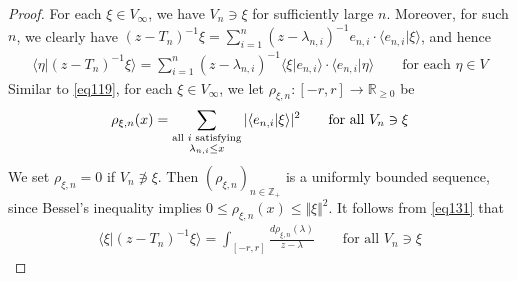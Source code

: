 \documentclass[12pt,b5paper,notitlepage]{article}
\theoremstyle{definition}
\theoremstyle{plain}
\newcommand{\bk}[1]{\langle {#1}\rangle}
\newcommand{\Zbb}{\mathbb Z}
\newcommand{\Rbb}{\mathbb R}
\numberwithin{equation}{section}
\begin{document}
\begin{proof}
For each $\xi\in V_\infty$, we have $V_n\ni\xi$ for sufficiently large $n$. Moreover, for such $n$, we clearly have $(z-T_n)^{-1}\xi=\sum_{i=1}^n(z-\lambda_{n,i})^{-1}e_{n,i}\cdot\bk{e_{n,i}|\xi}$, and hence
\begin{align}\label{eq131}
\bk{\eta|(z-T_n)^{-1}\xi}=\sum_{i=1}^n (z-\lambda_{n,i})^{-1}\bk{\xi|e_{n,i}}\cdot \bk{e_{n,i}|\eta}\qquad\text{for each }\eta\in V
\end{align}
Similar to \eqref{eq119}, for each $\xi\in V_\infty$, we let $\rho_{\xi,n}:[-r,r]\rightarrow\Rbb_{\geq0}$ be
\begin{align}
\rho_{\xi,n}(x)=\sum_{
\begin{subarray}{c}
\text{all $i$ satisfying}\\
\lambda_{n,i}\leq x
\end{subarray}
}|\bk{e_{n,i}|\xi}|^2
\qquad\text{for all }V_n\ni\xi
\end{align}
We set $\rho_{\xi,n}=0$ if $V_n\notni\xi$. Then $(\rho_{\xi,n})_{n\in\Zbb_+}$ is a uniformly bounded sequence, since Bessel's inequality implies $0\leq\rho_{\xi,n}(x)\leq\Vert\xi\Vert^2$. It follows from \eqref{eq131} that
\begin{align*}
\bk{\xi|(z-T_n)^{-1}\xi}=\int_{[-r,r]}\frac{d\rho_{\xi,n}(\lambda)}{z-\lambda}\qquad\text{for all }V_n\ni\xi
\end{align*}





\end{proof}
\end{document}
